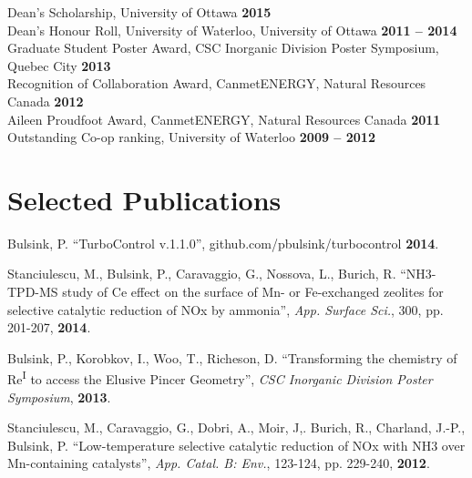 \documentclass[margin,line]{resume}
\begin{document}
\begin{resume}
	Dean's Scholarship, University of Ottawa \hfill \textbf{2015}\vspace{1mm}\\
    Dean's Honour Roll, University of Waterloo, University of Ottawa \hfill \textbf{2011 -- 2014}\vspace{1mm}\\%
    Graduate Student Poster Award, CSC Inorganic Division Poster Symposium, Quebec City \hfill \textbf{2013}\vspace{1mm}\\%
    Recognition of Collaboration Award, CanmetENERGY, Natural Resources Canada \hfill \textbf{2012}\vspace{1mm}\\%
    Aileen Proudfoot Award, CanmetENERGY, Natural Resources Canada \hfill \textbf{2011}\vspace{1mm}\\%
    Outstanding Co-op ranking, University of Waterloo \hfill \textbf{2009 -- 2012}\vspace{1mm}%


    \section{\mysidestyle Selected Publications}
    Bulsink, P. ``TurboControl v.1.1.0'', github.com/pbulsink/turbocontrol \textbf{2014}.
    
	\vspace{0mm}    
    
	\vspace{0mm}
	Stanciulescu, M., Bulsink, P., Caravaggio, G., Nossova, L., Burich, R. ``NH3-TPD-MS study of Ce effect on the surface of Mn- or Fe-exchanged zeolites for selective catalytic reduction of NOx by ammonia'', \textit{App. Surface Sci.}, 300, pp. 201-207, \textbf{2014}.

	\vspace{0mm}
	Bulsink, P., Korobkov, I., Woo, T., Richeson, D. ``Transforming the chemistry of Re\textsuperscript{I} to access the Elusive Pincer Geometry'', \textit{CSC Inorganic Division Poster Symposium}, \textbf{2013}.

	\vspace{0mm}
Stanciulescu, M., Caravaggio, G., Dobri, A., Moir, J,. Burich, R., Charland, J.-P., Bulsink, P. ``Low-temperature selective catalytic reduction of NOx with NH3 over Mn-containing catalysts'', \textit{App. Catal. B: Env.}, 123-124, pp. 229-240, \textbf{2012}.


\end{resume}
\end{document}
